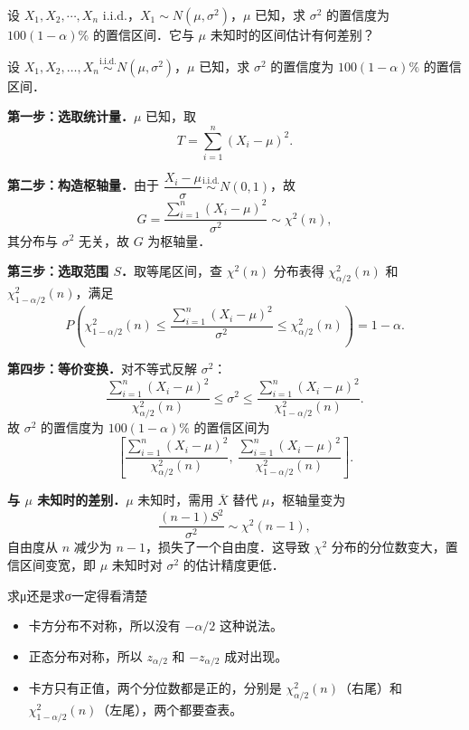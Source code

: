 \begin{homework}[2]
设 $X_1, X_2, \cdots, X_n$ i.i.d.，$X_1 \sim N(\mu, \sigma^2)$，$\mu$ 已知，求 $\sigma^2$ 的置信度为 $100(1-\alpha)\%$ 的置信区间．它与 $\mu$ 未知时的区间估计有何差别？
\end{homework}
\begin{solution}
设 $X_1, X_2, \ldots, X_n \overset{\text{i.i.d.}}{\sim} N(\mu, \sigma^2)$，$\mu$ 已知，求 $\sigma^2$ 的置信度为 $100(1-\alpha)\%$ 的置信区间．

\textbf{第一步：选取统计量．}$\mu$ 已知，取
\[
T = \sum_{i=1}^n (X_i - \mu)^2.
\]

\textbf{第二步：构造枢轴量．}由于 $\dfrac{X_i - \mu}{\sigma} \overset{\text{i.i.d.}}{\sim} N(0,1)$，故
\[
G = \frac{\sum_{i=1}^n (X_i - \mu)^2}{\sigma^2} \sim \chi^2(n),
\]
其分布与 $\sigma^2$ 无关，故 $G$ 为枢轴量．

\textbf{第三步：选取范围 $S$．}取等尾区间，查 $\chi^2(n)$ 分布表得 $\chi^2_{\alpha/2}(n)$ 和 $\chi^2_{1-\alpha/2}(n)$，满足
\[
P\!\left(\chi^2_{1-\alpha/2}(n) \leqslant \frac{\sum_{i=1}^n(X_i-\mu)^2}{\sigma^2} \leqslant \chi^2_{\alpha/2}(n)\right) = 1-\alpha.
\]

\textbf{第四步：等价变换．}对不等式反解 $\sigma^2$：
\[
\frac{\sum_{i=1}^n(X_i-\mu)^2}{\chi^2_{\alpha/2}(n)} \leqslant \sigma^2 \leqslant \frac{\sum_{i=1}^n(X_i-\mu)^2}{\chi^2_{1-\alpha/2}(n)}.
\]
故 $\sigma^2$ 的置信度为 $100(1-\alpha)\%$ 的置信区间为
\[
\left[\frac{\sum_{i=1}^n(X_i-\mu)^2}{\chi^2_{\alpha/2}(n)},\ \frac{\sum_{i=1}^n(X_i-\mu)^2}{\chi^2_{1-\alpha/2}(n)}\right].
\]

\textbf{与 $\mu$ 未知时的差别．}$\mu$ 未知时，需用 $\overline{X}$ 替代 $\mu$，枢轴量变为
\[
\frac{(n-1)S^2}{\sigma^2} \sim \chi^2(n-1),
\]
自由度从 $n$ 减少为 $n-1$，损失了一个自由度．这导致 $\chi^2$ 分布的分位数变大，置信区间变宽，即 $\mu$ 未知时对 $\sigma^2$ 的估计精度更低．
\end{solution}
\begin{dxtips}
    求μ还是求σ一定得看清楚
    \begin{itemize}
    \item 卡方分布不对称，所以没有 $-\alpha/2$ 这种说法。
    \item 正态分布对称，所以 $z_{\alpha/2}$ 和 $-z_{\alpha/2}$ 成对出现。
    \item 卡方只有正值，两个分位数都是正的，分别是 $\chi^2_{\alpha/2}(n)$（右尾）和 $\chi^2_{1-\alpha/2}(n)$（左尾），两个都要查表。
\end{itemize}
\end{dxtips}
